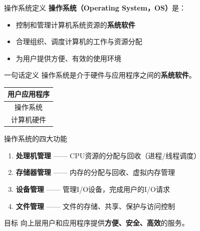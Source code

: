 \documentclass[10pt, aspectratio=169]{beamer}
\begin{document}
\begin{frame}{操作系统定义}
    \textbf{操作系统（Operating System，OS）}是：
    \begin{itemize}
        \item 控制和管理计算机系统资源的\textbf{系统软件}
        \item 合理组织、调度计算机的工作与资源分配
        \item 为用户提供方便、有效的使用环境
    \end{itemize}
    \vspace{1em}
    \begin{block}{一句话定义}
        操作系统是介于\textcolor{408blue}{硬件}与\textcolor{408blue}{应用程序}之间的\textbf{系统软件}。
    \end{block}
    \begin{center}
        \begin{tabular}{c}
            \hline
            用户应用程序 \\
            \hline
            \textcolor{408orange}{操作系统} \\
            \hline
            计算机硬件 \\
            \hline
        \end{tabular}
    \end{center}
\end{frame}

\begin{frame}{操作系统的四大功能}
    \begin{enumerate}
        \item \textbf{处理机管理} —— CPU资源的分配与回收（进程/线程调度）
        \item \textbf{存储器管理} —— 内存的分配与回收、虚拟内存管理
        \item \textbf{设备管理} —— 管理I/O设备，完成用户的I/O请求
        \item \textbf{文件管理} —— 文件的存储、共享、保护与访问控制
    \end{enumerate}
    \vspace{0.5em}
    \begin{block}{目标}
        向上层用户和应用程序提供\textbf{方便、安全、高效}的服务。
    \end{block}
\end{frame}
\end{document}
